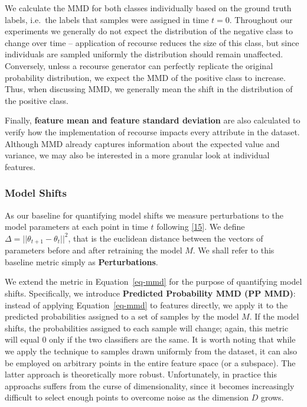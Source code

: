 \documentclass[
  conference]{IEEEtran}
\begin{document}
We calculate the MMD for both classes individually based on the ground
truth labels, i.e.~the labels that samples were assigned in time
\(t=0\). Throughout our experiments we generally do not expect the
distribution of the negative class to change over time -- application of
recourse reduces the size of this class, but since individuals are
sampled uniformly the distribution should remain unaffected. Conversely,
unless a recourse generator can perfectly replicate the original
probability distribution, we expect the MMD of the positive class to
increase. Thus, when discussing MMD, we generally mean the shift in the
distribution of the positive class.

Finally, \textbf{feature mean and feature standard deviation} are also
calculated to verify how the implementation of recourse impacts every
attribute in the dataset. Although MMD already captures information
about the expected value and variance, we may also be interested in a
more granular look at individual features.

\hypertarget{model-shifts}{%
\subsubsection{Model Shifts}\label{model-shifts}}

As our baseline for quantifying model shifts we measure perturbations to
the model parameters at each point in time \(t\) following
\protect\hyperlink{ref-upadhyay2021towards}{{[}15{]}}. We define
\(\Delta=||\theta_{t+1}-\theta_{t}||^2\), that is the euclidean distance
between the vectors of parameters before and after retraining the model
\(M\). We shall refer to this baseline metric simply as
\textbf{Perturbations}.

We extend the metric in Equation~\ref{eq-mmd} for the purpose of
quantifying model shifts. Specifically, we introduce \textbf{Predicted
Probability MMD (PP MMD)}: instead of applying Equation~\ref{eq-mmd} to
features directly, we apply it to the predicted probabilities assigned
to a set of samples by the model \(M\). If the model shifts, the
probabilities assigned to each sample will change; again, this metric
will equal 0 only if the two classifiers are the same. It is worth
noting that while we apply the technique to samples drawn uniformly from
the dataset, it can also be employed on arbitrary points in the entire
feature space (or a subspace). The latter approach is theoretically more
robust. Unfortunately, in practice this approachs suffers from the curse
of dimensionality, since it becomes increasingly difficult to select
enough points to overcome noise as the dimension \(D\) grows.
\end{document}
